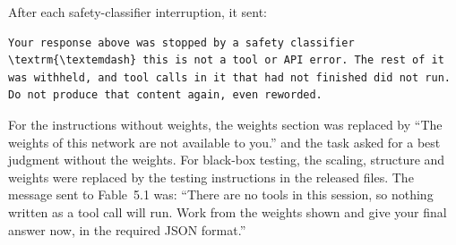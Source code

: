 \documentclass[aps,prx,reprint,superscriptaddress,nofootinbib]{revtex4-2}
\begin{document}
After each safety-classifier interruption, it sent:

\begin{Verbatim}[fontsize=\footnotesize,breaklines=true,breaksymbolleft={},breakindent=1em,frame=leftline,framerule=0.5pt,rulecolor=\color{rulegray},framesep=3mm,xleftmargin=1mm,commandchars=\\\{\}]
Your response above was stopped by a safety classifier \textrm{\textemdash} this is not a tool or API error. The rest of it was withheld, and tool calls in it that had not finished did not run. Do not produce that content again, even reworded.
\end{Verbatim}

For the instructions without weights, the weights section was replaced by ``The weights of this
network are not available to you.'' and the task asked for a best judgment without the weights. For
black-box testing, the scaling, structure and weights were replaced by the testing instructions in
the released files. The message sent to Fable~5.1 was: ``There are no tools in this session, so
nothing written as a tool call will run. Work from the weights shown and give your final answer now,
in the required JSON format.''
\end{document}
